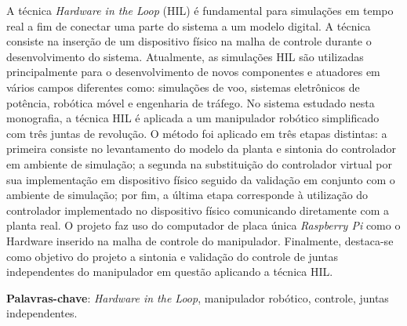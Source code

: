 \setlength{\absparsep}{18pt} %
\begin{resumo}
  A técnica \textit{Hardware in the Loop} (HIL) é fundamental para simulações em tempo real a fim de conectar uma parte 
  do sistema a um modelo digital. A técnica consiste na inserção de um dispositivo físico na malha de controle
  durante o desenvolvimento do sistema. Atualmente, as simulações HIL são utilizadas principalmente para o 
  desenvolvimento de novos componentes e atuadores em vários campos diferentes como: simulações de voo, 
  sistemas eletrônicos de potência, robótica móvel e engenharia de tráfego. No sistema estudado nesta monografia, a técnica 
  HIL é aplicada a um manipulador robótico simplificado com três juntas de revolução. O método foi aplicado em 
  três etapas distintas: a primeira consiste no levantamento do modelo da planta e sintonia do controlador em 
  ambiente de simulação; a segunda na substituição do controlador virtual por sua implementação em dispositivo 
  físico seguido da validação em conjunto com o ambiente de simulação; por fim, a última etapa corresponde à 
  utilização do controlador implementado no dispositivo físico comunicando diretamente com a planta real. O projeto
  faz uso do computador de placa única \textit{Raspberry Pi} como o Hardware inserido na malha de controle do manipulador.
  Finalmente, destaca-se como objetivo do projeto a sintonia e validação do controle de juntas independentes do
  manipulador em questão aplicando a técnica HIL.
  
 \textbf{Palavras-chave}: \textit{Hardware in the Loop}, manipulador robótico, controle, juntas independentes.
\end{resumo}